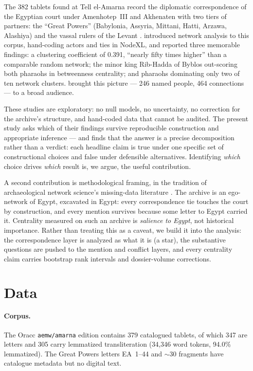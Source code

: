 \documentclass[11pt]{article}
\newcommand{\project}[1]{\texttt{#1}}
\begin{document}
The 382 tablets found at Tell el-Amarna record the diplomatic
correspondence of the Egyptian court under Amenhotep~III and Akhenaten
with two tiers of partners: the ``Great Powers'' (Babylonia, Assyria,
Mittani, Hatti, Arzawa, Alashiya) and the vassal rulers of the Levant
\citep{Moran1992, Rainey2015, CohenWestbrook2000}. \citet{ClineCline2015}
introduced network analysis to this corpus, hand-coding actors and ties
in NodeXL, and reported three memorable findings: a clustering
coefficient of 0.391, ``nearly fifty times higher'' than a comparable
random network; the minor king Rib-Hadda of Byblos out-scoring both
pharaohs in betweenness centrality; and pharaohs dominating only two of
ten network clusters. \citet{Cline2025} brought this picture --- 246
named people, 464 connections --- to a broad audience.

These studies are exploratory: no null models, no uncertainty, no
correction for the archive's structure, and hand-coded data that cannot
be audited. The present study asks which of their findings survive
reproducible construction and appropriate inference --- and finds that
the answer is a precise decomposition rather than a verdict: each
headline claim is true under one specific set of constructional choices
and false under defensible alternatives. Identifying \emph{which} choice
drives \emph{which} result is, we argue, the useful contribution.

A second contribution is methodological framing, in the tradition of
archaeological network science's missing-data literature
\citep{Collar2015, BrughmansPeeples2023}. The archive is an ego-network
of Egypt, excavated in Egypt: every correspondence tie touches the court
by construction, and every mention survives because some letter to Egypt
carried it. Centrality measured on such an archive is \emph{salience to
Egypt}, not historical importance. Rather than treating this as a caveat,
we build it into the analysis: the correspondence layer is analyzed as
what it is (a star), the substantive questions are pushed to the mention
and conflict layers, and every centrality claim carries bootstrap rank
intervals and dossier-volume corrections.

\section{Data}

\paragraph{Corpus.} The Oracc \project{aemw/amarna} edition
\citep[catalogue timestamp 2024-07-05]{LauingerYoder2025} contains 379
catalogued tablets, of which 347 are letters and 305 carry lemmatized
transliteration (34,346 word tokens, 94.0\% lemmatized). The Great Powers
letters EA~1--44 and ${\sim}30$ fragments have catalogue metadata but no
digital text.
\end{document}
